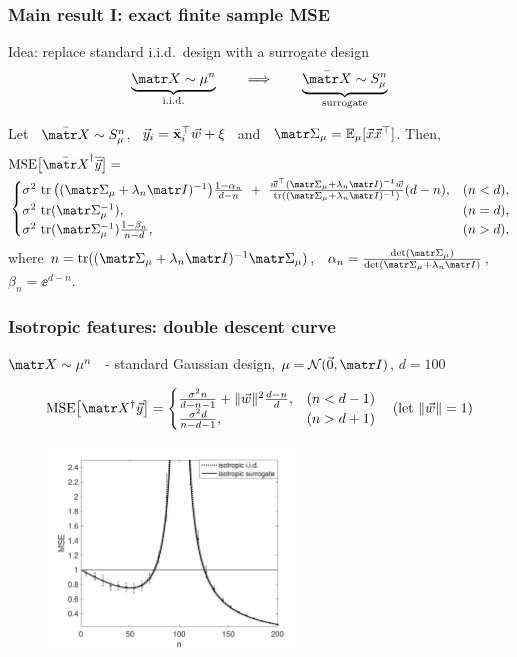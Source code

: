 \begin{frame}
  \frametitle{Main result I: exact finite sample MSE}
  Idea: replace standard i.i.d.~design with a surrogate design
  \begin{align*}
    \underbrace{\X\sim\mu^n}_{\text{i.i.d.}}\qquad\Longrightarrow\qquad
    \underbrace{\Xb\sim S_\mu^n}_{\text{surrogate}} 
  \end{align*}
  \pause\vspace{-2mm}
  \begin{theorem}
\label{t:mse}
Let \ $\Xb\sim S_\mu^n$, \ $\vec{y}_i=\bar{\mathbf x}_i^\top{\vec{w}}+\xi$ \ and \
$\Sigmab_\mu=\E_\mu[\x\x^\top]$. Then,
  \begin{align*}
 &\MSE{\Xb^\dagger\ybb} =\\
  &  \begin{cases}
    \sigma^2\,\tr\big((\Sigmab_\mu+\lambda_n\I)^{-1}\big)
    \frac{1-\alpha_n}{d-n}\ +\
\frac{\w^{\top}(\Sigmab_\mu+\lambda_n\I)^{-1}\w}
{\tr((\Sigmab_\mu+\lambda_n\I)^{-1})}(d-n),
& (n<d),\\
\sigma^2\, \tr(\Sigmab_\mu^{-1}),& (n=d),\\
\sigma^2\,\tr(\Sigmab_\mu^{-1})\frac{1-\beta_n}{n-d},&(n>d),
\end{cases}
  \end{align*}
  \pause where
  $n=\tr((\Sigmab_\mu+\lambda_n\I)^{-1}\Sigmab_\mu)$, \
  $\alpha_n=\frac{\det(\Sigmab_\mu)}{\det(\Sigmab_\mu+\lambda_n\I)}$,
\ $\beta_n=\ee^{d-n}$.
\end{theorem}
\end{frame}

\begin{frame}
  \frametitle{Isotropic features: double descent curve}
  $\X\sim\mu^n$ \ - standard Gaussian design, $\mu=\Nc(\vec{0},\I)$, $d=100$

      \begin{align*}
        \MSE{\X^\dagger\y} =
        \begin{cases}
          \frac{\sigma^2n}{d-n-1} + \|\w\|^2\frac{d-n}{d},&(n<d-1)\\
          \frac{\sigma^2d}{n-d-1},&(n>d+1)
        \end{cases}\quad(\text{let }\|\w\|=1)
      \end{align*}
      \vspace{-2mm}
      \begin{figure}
          \centering
          \includegraphics[width=0.6\textwidth]{Figures/descent/descent-isotropic.pdf}
      \end{figure}
\end{frame}


